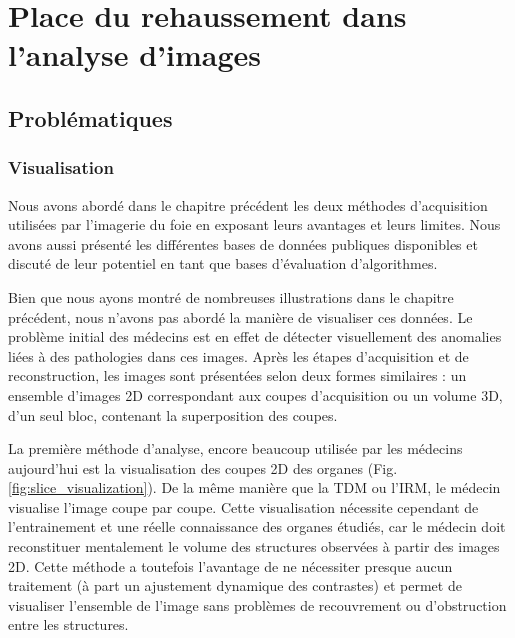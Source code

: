 %
\chapter{Place du rehaussement dans l'analyse d'images}
\label{sec:SOTA}


\section{Problématiques}
    \subsection{Visualisation}

    Nous avons abordé dans le chapitre précédent les deux méthodes d'acquisition utilisées par l'imagerie du foie en exposant leurs avantages et leurs limites. Nous avons aussi présenté les différentes bases de données publiques disponibles et discuté de leur potentiel en tant que bases d'évaluation d'algorithmes.

    Bien que nous ayons montré de nombreuses illustrations dans le chapitre précédent, nous n'avons pas abordé la manière de visualiser ces données.
    Le problème initial des médecins est en effet de détecter visuellement des anomalies liées à des pathologies dans ces images. Après les étapes d'acquisition et de reconstruction, les images sont présentées selon deux formes similaires : un ensemble d'images 2D correspondant aux coupes d'acquisition ou un volume 3D, d'un seul bloc, contenant la superposition des coupes.
    
    La première méthode d'analyse, encore beaucoup utilisée par les médecins aujourd'hui est la visualisation des coupes 2D des organes (Fig. \ref{fig:slice_visualization}). De la même manière que la TDM ou l'IRM, le médecin visualise l'image coupe par coupe. Cette visualisation nécessite cependant de l'entrainement et une réelle connaissance des organes étudiés, car le médecin doit reconstituer mentalement le volume des structures observées à partir des images 2D. Cette méthode a toutefois l'avantage de ne nécessiter presque aucun traitement (à part un ajustement dynamique des contrastes) et permet de visualiser l'ensemble de l'image sans problèmes de recouvrement ou d'obstruction entre les structures. 

